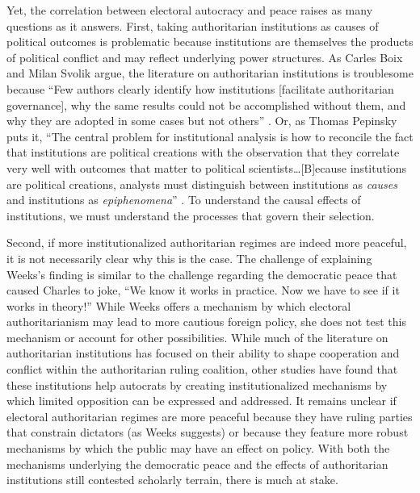 \documentclass[12pt]{article}
\begin{document}
\par Yet, the correlation between electoral autocracy and peace raises as many questions as it answers. First, taking authoritarian institutions as causes of political outcomes is problematic because institutions are themselves the products of political conflict and may reflect underlying power structures. As Carles Boix and Milan Svolik argue, the literature on authoritarian institutions is troublesome because \enquote{Few authors clearly identify how institutions [facilitate authoritarian governance], why the same results could not be accomplished without them, and why they are adopted in some cases but not others} \parencite*[301]{boix:2013}. Or, as Thomas Pepinsky puts it, \enquote{The central problem for institutional analysis is how to reconcile the fact that institutions are political creations with the observation that they correlate very well with outcomes that matter to political scientists\ldots [B]ecause institutions are political creations, analysts must distinguish between institutions as \textit{causes} and institutions as \textit{epiphenomena}} \parencite*[648]{pepinsky:2014}. To understand the causal effects of institutions, we must understand the processes that govern their selection. 

\par Second, if more institutionalized authoritarian regimes are indeed more peaceful, it is not necessarily clear why this is the case. The challenge of explaining Weeks's finding is similar to the challenge regarding the democratic peace that caused Charles \textcite{lipson:2005} to joke, ``We know it works in practice. Now we have to see if it works in theory!'' While Weeks offers a mechanism by which electoral authoritarianism may lead to more cautious foreign policy, she does not test this mechanism or account for other possibilities. While much of the literature on authoritarian institutions has focused on their ability to shape cooperation and conflict within the authoritarian ruling coalition, other studies have found that these institutions help autocrats by creating institutionalized mechanisms by which limited opposition can be expressed and addressed. It remains unclear if electoral authoritarian regimes are more peaceful because they have ruling parties that constrain dictators (as Weeks suggests) or because they feature more robust mechanisms by which the public may have an effect on policy. With both the mechanisms underlying the democratic peace and the effects of authoritarian institutions still contested scholarly terrain, there is much at stake.
\end{document}
